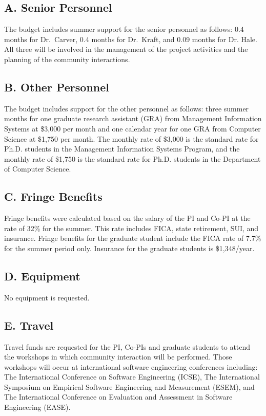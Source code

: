 
\subsection*{A. Senior Personnel}

The budget includes summer support for the senior personnel as follows: 0.4 months for Dr.\ Carver, 0.4 months for Dr.\ Kraft, and 0.09 months for Dr. Hale. All three will be involved in the management of the project activities and the planning of the community interactions.

\subsection*{B. Other Personnel}

The budget includes support for the other personnel as follows:
three summer months for one graduate research assistant (GRA) from Management Information Systems at \$3,000 per month and
one calendar year for one GRA from Computer Science at \$1,750 per month.
The monthly rate of \$3,000 is the standard rate for Ph.D. students
in the Management Information Systems Program, and
the monthly rate of \$1,750 is the standard rate for Ph.D. students
in the Department of Computer Science.

\subsection*{C. Fringe Benefits}

Fringe benefits were calculated based on the salary of the PI and Co-PI at the rate of 32\% for the summer. This rate includes FICA, state retirement, SUI, and insurance. Fringe benefits for the graduate student include the FICA rate of 7.7\% for the summer period only. Insurance for the graduate students is \$1,348/year.

\subsection*{D. Equipment}
No equipment is requested.

\subsection*{E. Travel}

Travel funds are requested for the PI, Co-PIs and graduate students to attend the workshops in which community interaction will be performed. Those workshops will occur at international software engineering conferences including: The International Conference on Software Engineering (ICSE), The International Symposium on Empirical Software Engineering and Measurement (ESEM), and The International Conference on Evaluation and Assessment in Software Engineering (EASE).

